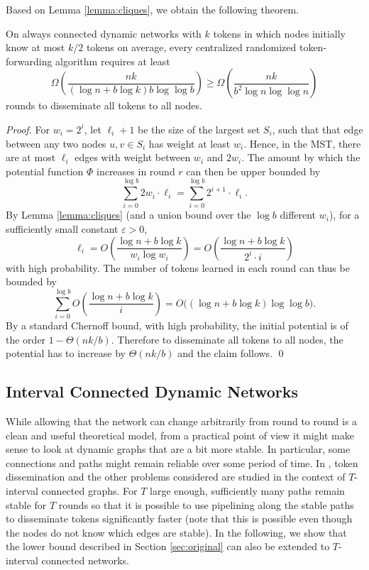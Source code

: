\documentclass{llncs}
\newcommand{\eps}{\varepsilon}
\begin{document}
Based on Lemma \ref{lemma:cliques}, we obtain the following theorem.

\begin{theorem}\label{thm:multipletoken}
    On always connected dynamic networks with $k$ tokens in which
    nodes initially know at most $k/2$ tokens on average, every
    centralized randomized token-forwarding algorithm requires at least
    \[
    \Omega\left( \frac{nk}{(\log n + b\log k)b\log\log b} \right) \geq 
    \Omega\left( \frac{nk}{b^2 \log n \log \log n} \right)
    \]
    rounds to disseminate all tokens to all nodes.
\end{theorem}

\begin{proof}
    For $w_i=2^i$, let $\ell_i+1$ be the size of the largest set
    $S_i$, such that that edge between any two nodes $u,v\in S_i$ has
    weight at least $w_i$. Hence, in the MST, there are at most
    $\ell_i$ edges with weight between $w_i$ and $2w_i$. The amount by
    which the potential function $\Phi$ increases in round $r$ can
    then be upper bounded by
    \[
    \sum_{i=0}^{\log b} 2w_i\cdot\ell_i = \sum_{i=0}^{\log b}2^{i+1}\cdot\ell_i.
    \]
    By Lemma \ref{lemma:cliques} (and a union bound over the $\log b$
    different $w_i$), for a sufficiently small constant $\eps>0$,
    \[
    \ell_i = O\left(\frac{\log n + b\log k}{w_i\log w_i}\right) =
    O\left(\frac{\log n + b\log k}{2^i\cdot i}\right)
    \]
    with high probability. The number of tokens learned in each round
    can thus be bounded by
    \[
    \sum_{i=0}^{\log b}O\left(\frac{\log n + b\log k}{i}\right) = 
    O\big((\log n + b\log k)\log\log b\big).
    \]
    By a standard Chernoff bound, with high probability, the initial
    potential is of the order $1-\Theta(nk/b)$. Therefore to
    disseminate all tokens to all nodes, the potential has to increase
    by $\Theta(nk/b)$ and the claim follows.
\hspace*{\fill}\qed\end{proof}

\subsection{Interval Connected Dynamic Networks}
\label{sec:interval}

While allowing that the network can change arbitrarily from round to
round is a clean and useful theoretical model, from a practical point
of view it might make sense to look at dynamic graphs that are a bit
more stable. In particular, some connections and paths might remain
reliable over some period of time. In \cite{KLO}, token dissemination
and the other problems considered are studied in the context of
$T$-interval connected graphs. For $T$ large enough, sufficiently many
paths remain stable for $T$ rounds so that it is possible to use
pipelining along the stable paths to disseminate tokens significantly
faster (note that this is possible even though the nodes do not know
which edges are stable). In the following, we show that the lower
bound described in Section \ref{sec:original} can also be extended to
$T$-interval connected networks.
\end{document}
